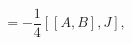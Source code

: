 \begin{equation}      
         [AJB]=-\frac{1}{4}[[A,B],J],         \label{eq:onbir}       
\end{equation}

